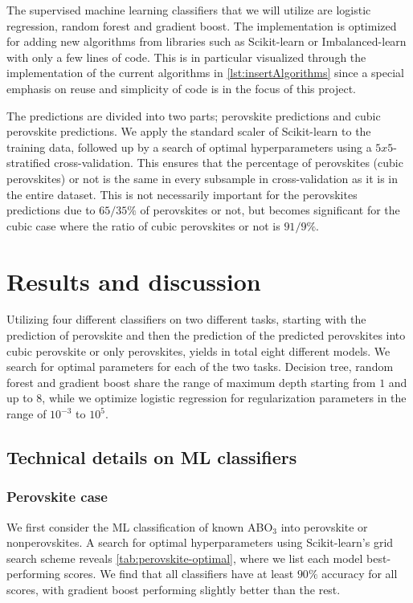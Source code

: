 The supervised machine learning classifiers that we will utilize are logistic regression, random forest and gradient boost. The implementation is optimized for adding new algorithms from libraries such as Scikit-learn \cite{Pedregosa2012} or Imbalanced-learn \cite{Lemaitre2016} with only a few lines of code. This is in particular visualized through the implementation of the current algorithms in \autoref{lst:insertAlgorithms} since a special emphasis on reuse and simplicity of code is in the focus of this project.

The predictions are divided into two parts; perovskite predictions and cubic perovskite predictions. We apply the standard scaler of Scikit-learn \cite{Pedregosa2012} to the training data, followed up by a search of optimal hyperparameters using a $5x5$-stratified cross-validation. This ensures that the percentage of perovskites (cubic perovskites) or not is the same in every subsample in cross-validation as it is in the entire dataset. This is not necessarily important for the perovskites predictions due to $65/35 \%$ of perovskites or not, but becomes significant for the cubic case where the ratio of cubic perovskites or not is $91/9\%$.

\section{Results and discussion}

Utilizing four different classifiers on two different tasks, starting with the prediction of perovskite and then the prediction of the predicted perovskites into cubic perovskite or only perovskites, yields in total eight different models. We search for optimal parameters for each of the two tasks. Decision tree, random forest and gradient boost share the range of maximum depth starting from $1$ and up to $8$, while we optimize logistic regression for regularization parameters in the range of $10^{-3}$ to $10^5$.

\subsection{Technical details on ML classifiers}

\subsubsection{Perovskite case}
We first consider the ML classification of known ABO$_3$ into perovskite or nonperovskites. A search for optimal hyperparameters using Scikit-learn's grid search scheme \cite{Pedregosa2012} reveals \autoref{tab:perovskite-optimal}, where we list each model best-performing scores. We find that all classifiers have at least $90\%$ accuracy for all scores, with gradient boost performing slightly better than the rest.

